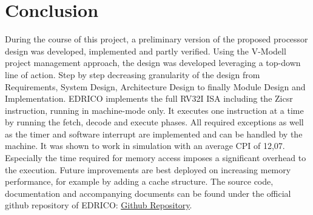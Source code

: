 \chapter{Conclusion}
During the course of this project, a preliminary version of the proposed processor design was developed, implemented and partly verified. Using the V-Modell project management approach, the design was developed leveraging a top-down line of action. Step by step decreasing granularity of the design from Requirements, System Design, Architecture Design to finally Module Design and Implementation. \ac{EDRICO} implements the full \ac{RV32I} \ac{ISA} including the Zicsr instruction, running in machine-mode only. It executes one instruction at a time by running the fetch, decode and execute phases. All required exceptions as well as the timer and software interrupt are implemented and can be handled by the machine. It was shown to work in simulation with an average \ac{CPI} of 12,07. Especially the time required for memory access imposes a significant overhead to the execution. Future improvements are best deployed on increasing memory performance, for example by adding a cache structure. The source code, documentation and accompanying documents can be found under the official github repository of \ac{EDRICO}: \underline{\href{https://github.com/LeviBohnacker/EDRICO}{Github Repository}}.
